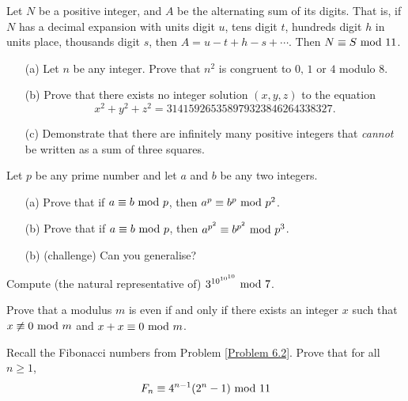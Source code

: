 \vspace{0.1in}

\begin{problem}\label{Problem 8.3}
Let $N$ be a positive integer, and $A$ be the alternating sum of its digits. That is, if $N$ has a decimal expansion with units digit $u$, tens digit $t$, hundreds digit $h$ in units place, thousands digit $s$, then $A = u - t + h - s + \cdots$. Then $N \equiv S\text{ mod }{11}$.
\end{problem}

\vspace{0.1in}

\begin{problem}\label{Problem 8.4}\hfill
\begin{itemize}
\item[(a)] Let $n$ be any integer. Prove that $n^2$ is congruent to $0,\, 1$ or $4$ modulo $8$.
\item[(b)] Prove that there exists no integer solution $(x, y, z)$ to the equation
\[x^2 + y^2 + z^2 = 314159265358979323846264338327.\]
\item[(c)] Demonstrate that there are infinitely many positive integers that \emph{cannot} be written as a sum of three squares.
\end{itemize}
\end{problem}

\vspace{0.1in}

\begin{problem}\label{Problem 8.5}
Let $p$ be any prime number and let $a$ and $b$ be any two integers.
\begin{itemize}
\item[(a)] Prove that if $a \equiv b \text{ mod }{p}$, then $a^p \equiv b^p \text{ mod }{p^2}$.
\item[(b)] Prove that if $a \equiv b \text{ mod }{p}$, then $a^{p^2} \equiv b^{p^2} \text{ mod }{p^3}$.
\item[(b)] (challenge) Can you generalise?
\end{itemize}
\end{problem}

\vspace{0.1in}

\begin{problem}\label{Problem 8.6}
Compute (the natural representative of) $3^{10^{10^{10}}}\text{ mod }{7}$.
\end{problem}

\vspace{0.1in}

\begin{problem}\label{Problem 8.7}
Prove that a modulus $m$ is even if and only if there exists an integer $x$ such that $x \not\equiv 0\text{ mod }{m}$ and $x + x\equiv 0\text{ mod }{m}$.
\end{problem}

\vspace{0.1in}

\begin{problem}\label{Problem 8.8}
Recall the Fibonacci numbers from Problem \ref{Problem 6.2}. Prove that for all $n\geq 1$,
\[F_n \equiv 4^{n-1}(2^n - 1)\text{ mod }{11}\]
\end{problem}
